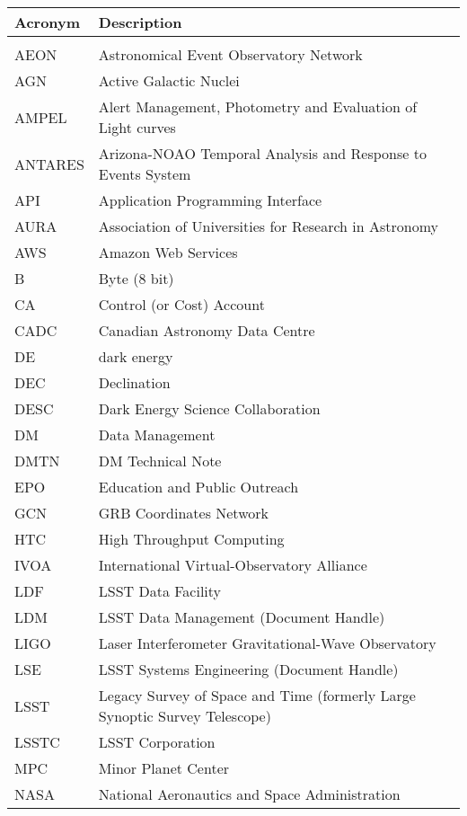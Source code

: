 \addtocounter{table}{-1}
\begin{longtable}{p{}p{}}\hline
\textbf{Acronym} & \textbf{Description}  \\\hline

 &  \\\hline
AEON & Astronomical Event Observatory Network \\\hline
AGN & Active Galactic Nuclei \\\hline
AMPEL & Alert Management, Photometry and Evaluation of Light curves \\\hline
ANTARES & Arizona-NOAO Temporal Analysis and Response to Events System \\\hline
API & Application Programming Interface \\\hline
AURA & Association of Universities for Research in Astronomy \\\hline
AWS & Amazon Web Services \\\hline
B & Byte (8 bit) \\\hline
CA & Control (or Cost) Account \\\hline
CADC & Canadian Astronomy Data Centre \\\hline
DE & dark energy \\\hline
DEC & Declination \\\hline
DESC & Dark Energy Science Collaboration \\\hline
DM & Data Management \\\hline
DMTN & DM Technical Note \\\hline
EPO & Education and Public Outreach \\\hline
GCN & GRB Coordinates Network \\\hline
HTC & High Throughput Computing \\\hline
IVOA & International Virtual-Observatory Alliance \\\hline
LDF & LSST Data Facility \\\hline
LDM & LSST Data Management (Document Handle) \\\hline
LIGO & Laser Interferometer Gravitational-Wave Observatory \\\hline
LSE & LSST Systems Engineering (Document Handle) \\\hline
LSST & Legacy Survey of Space and Time (formerly Large Synoptic Survey Telescope) \\\hline
LSSTC & LSST Corporation \\\hline
MPC & Minor Planet Center \\\hline
NASA & National Aeronautics and Space Administration \\\hline

\end{longtable}
